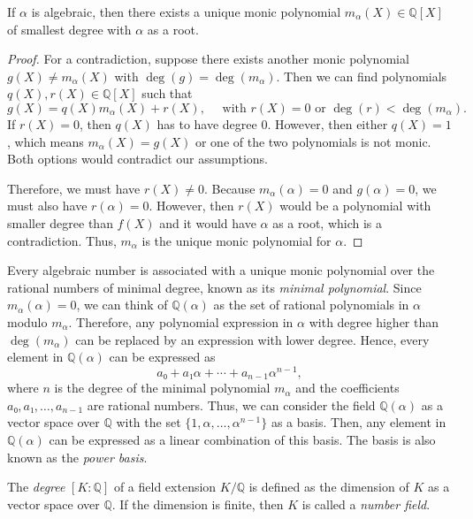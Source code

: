 \begin{lemma}
  If $α$ is algebraic, then there exists a unique monic polynomial $m_α(X) ∈ ℚ[X]$
  of smallest degree with $α$ as a root.
\end{lemma}

\begin{proof}
  For a contradiction, suppose there exists another monic polynomial $g(X) ≠
  m_α(X)$ with $\deg(g) = \deg(m_α)$.
  Then we can find polynomials $q(X), r(X) ∈ ℚ[X]$ such that
  \[
    g(X) = q(X) m_α(X) + r(X), \quad \text{ with } r(X) = 0 \text{ or } \deg(r) < \deg(m_α).
  \]
  If $r(X) = 0$, then $q(X)$ has to have degree $0$.
  However, then either $q(X) = 1$, which means $m_α(X) = g(X)$ or one of
  the two polynomials is not monic.
  Both options would contradict our assumptions.

  Therefore, we must have $r(X) ≠ 0$.
  Because $m_α(α) = 0$ and $g(α) = 0$, we must also have $r(α) = 0$.
  However, then $r(X)$ would be a polynomial with smaller degree than $f(X)$
  and it would have $α$ as a root, which is a contradiction.
  Thus, $m_α$ is the unique monic polynomial for $α$.
\end{proof}

Every algebraic number is associated with a unique monic polynomial over the rational numbers
of minimal degree, known as its \emph{minimal polynomial}.
Since $m_α(α) = 0$,
we can think of $ℚ(α)$ as the set of rational polynomials in $α$ modulo $m_α$.
Therefore, any polynomial expression in $α$ with degree higher than $\deg(m_α)$
can be replaced by an expression with lower degree.
Hence, every element in $ℚ(α)$ can be expressed as
\[
  a₀ + a₁ α + ⋯ + a_{n-1} α^{n-1},
\]
where $n$ is the degree of the minimal polynomial $m_α$
and the coefficients $a₀, a₁, …, a_{n-1}$ are rational numbers.
Thus,
we can consider the field $ℚ(α)$ as a vector space over $ℚ$
with the set $\{1, α, …, α^{n-1}\}$ as a basis.
Then,
any element in $ℚ(α)$ can be expressed as a linear combination of this basis.
The basis is also known as the \emph{power basis}.

\begin{definition}
  The \emph{degree} $[K : ℚ]$ of a field extension $K/ℚ$ is defined as the
  dimension of $K$ as a vector space over $ℚ$.
  If the dimension is finite, then $K$ is called a \emph{number field}.
\end{definition}

